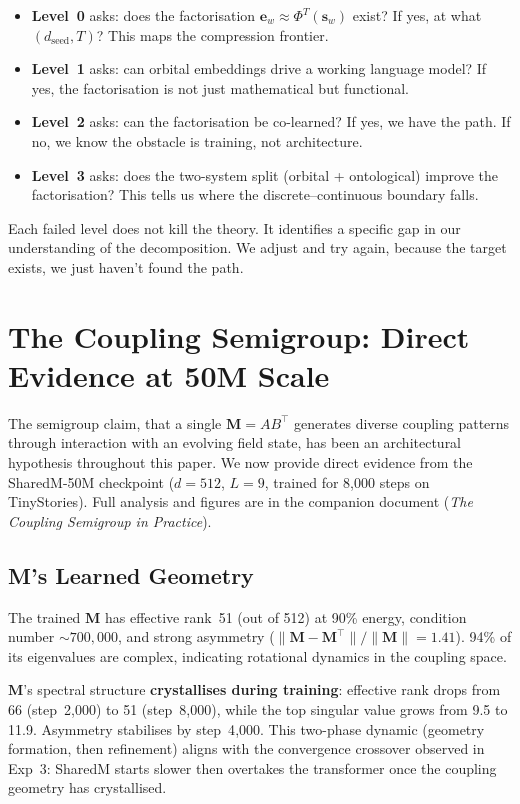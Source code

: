 \documentclass[11pt, a4paper]{article}
\newcommand{\M}{\mathbf{M}}
\newcommand{\s}{\mathbf{s}}
\theoremstyle{remark}
\begin{document}
\begin{itemize}[nosep]
    \item \textbf{Level~0} asks: does the factorisation $\mathbf{e}_w \approx \Phi^T(\s_w)$ exist?
    If yes, at what $(d_{\text{seed}}, T)$?
    This maps the compression frontier.
    \item \textbf{Level~1} asks: can orbital embeddings drive a working language model?
    If yes, the factorisation is not just mathematical but functional.
    \item \textbf{Level~2} asks: can the factorisation be co-learned?
    If yes, we have the path. If no, we know the obstacle is training, not architecture.
    \item \textbf{Level~3} asks: does the two-system split (orbital + ontological) improve the factorisation?
    This tells us where the discrete--continuous boundary falls.
\end{itemize}

Each failed level does not kill the theory.
It identifies a specific gap in our understanding of the decomposition.
We adjust and try again, because the target exists, we just haven't found the path.


\section{The Coupling Semigroup: Direct Evidence at 50M Scale}\label{sec:semigroup}

The semigroup claim, that a single $\M = AB^\top$ generates diverse coupling patterns through interaction with an evolving field state, has been an architectural hypothesis throughout this paper.
We now provide direct evidence from the SharedM-50M checkpoint ($d{=}512$, $L{=}9$, trained for 8{,}000 steps on TinyStories).
Full analysis and figures are in the companion document (\textit{The Coupling Semigroup in Practice}).

\subsection{M's Learned Geometry}

The trained $\M$ has effective rank~51 (out of 512) at 90\% energy, condition number ${\sim}700{,}000$, and strong asymmetry ($\|\M - \M^\top\|/\|\M\| = 1.41$).
94\% of its eigenvalues are complex, indicating rotational dynamics in the coupling space.

$\M$'s spectral structure \textbf{crystallises during training}: effective rank drops from 66 (step~2{,}000) to 51 (step~8{,}000), while the top singular value grows from 9.5 to 11.9.
Asymmetry stabilises by step~4{,}000.
This two-phase dynamic (geometry formation, then refinement) aligns with the convergence crossover observed in Exp~3: SharedM starts slower then overtakes the transformer once the coupling geometry has crystallised.
\end{document}
